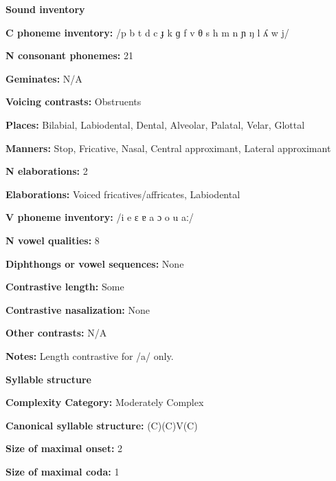 \textbf{Sound inventory}



\textbf{C phoneme inventory:} /p b t d c ɟ k ɡ f v θ s h m n ɲ ŋ l ʎ w j/



\textbf{N consonant phonemes:} 21



\textbf{Geminates:} N/A



\textbf{Voicing contrasts:} Obstruents



\textbf{Places:} Bilabial, Labiodental, Dental, Alveolar, Palatal, Velar, Glottal



\textbf{Manners:} Stop, Fricative, Nasal, Central approximant, Lateral approximant



\textbf{N elaborations:} 2



\textbf{Elaborations:} Voiced fricatives/affricates, Labiodental



\textbf{V phoneme inventory:} /i e ɛ ɐ a ɔ o u aː/



\textbf{N vowel qualities:} 8



\textbf{Diphthongs or vowel sequences:} None



\textbf{Contrastive length:} Some



\textbf{Contrastive nasalization:} None



\textbf{Other contrasts:} N/A



\textbf{Notes:} Length contrastive for /a/ only.



\textbf{Syllable structure}



\textbf{Complexity Category:} Moderately Complex



\textbf{Canonical syllable structure:} (C)(C)V(C) \citep[123-7]{Clark2008}



\textbf{Size of maximal onset:} 2



\textbf{Size of maximal coda:} 1



